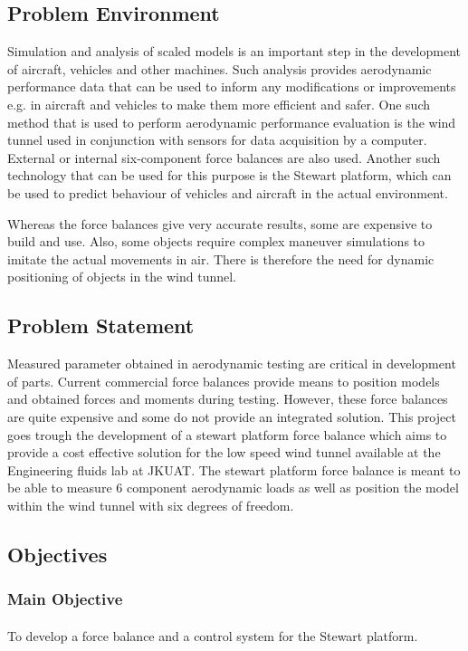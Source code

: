 \subsection{Problem Environment}
Simulation and analysis of scaled models is an important step in the development of aircraft, vehicles and other machines. Such analysis provides aerodynamic performance data that can be used to inform any modifications or improvements e.g. in aircraft and vehicles to make them more efficient and safer. One such method that is used to perform aerodynamic performance evaluation is the wind tunnel used in conjunction with sensors for data acquisition by a computer. External or internal six-component force balances are also used. Another such technology that can be used for this purpose is the Stewart platform, which can be used to predict behaviour of vehicles and aircraft in the actual environment.

Whereas the force balances give very accurate results, some are expensive to build and use. Also, some objects require complex maneuver simulations to imitate the actual movements in air. There is therefore the need for dynamic positioning of objects in the wind tunnel.
\subsection{Problem Statement}
Measured parameter obtained in aerodynamic testing are critical in development of parts. Current commercial force balances provide means to position models and obtained forces and moments during testing. 
However, these force balances are quite expensive and some do not provide an integrated solution. This project goes trough the development of a stewart platform force balance which aims to provide a cost effective solution for the low speed wind tunnel available at the Engineering fluids lab at JKUAT. 
The stewart platform force balance is meant to be able to measure 6 component aerodynamic loads as well as position the model within the wind tunnel with six degrees of freedom.
\subsection{Objectives}
\subsubsection{Main Objective}
\paragraph{} To develop a force balance and a control system for the Stewart platform. 
